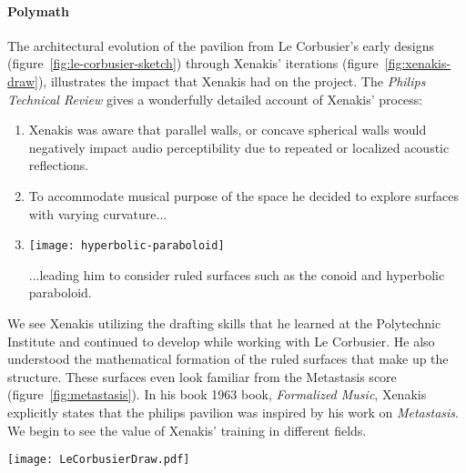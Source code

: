 \paragraph{Polymath} The architectural evolution of the pavilion from
Le Corbusier's early designs (figure~\ref{fig:le-corbusier-sketch})
through Xenakis' iterations (figure~\ref{fig:xenakis-draw}),
illustrates the impact that Xenakis had on the project. The
\textit{Philips Technical Review}\cite{philips1958} gives a
wonderfully detailed account of Xenakis' process:
\begin{enumerate}
\item Xenakis was aware that parallel walls, or concave spherical
  walls would negatively impact audio perceptibility due to repeated
  or localized acoustic reflections.
\item To accommodate musical purpose of the space he decided to explore
  surfaces with varying curvature...
\item 
  \begin{marginfigure}
    \texttt{[image: hyperbolic-paraboloid]}
    \caption{A ruled surface. For a surface to be considered ``ruled'' every point on
      the surface must be on a straight line, and that line must lie
      on the surface. In Xenakis' time ruled surfaces were useful in
      architecture, because they simplified the construction of curved
      surfaces by using straight beams.}
    \label{fig:ruled-surface}
  \end{marginfigure}...leading him to consider ruled surfaces such as
  the conoid and hyperbolic paraboloid. 
\end{enumerate}
We see Xenakis utilizing the drafting skills that he learned at the
Polytechnic Institute and continued to develop while working with Le
Corbusier. He also understood the mathematical formation of the ruled
surfaces that make up the structure. These surfaces even look familiar
from the Metastasis score (figure~\ref{fig:metastasis}). In his book
1963 book, \textit{Formalized Music}, Xenakis explicitly states that
the philips pavilion was inspired by his work on
\textit{Metastasis}. We begin to see the value of Xenakis' training in
different fields.

\begin{figure*}[h]
  \texttt{[image: LeCorbusierDraw.pdf]}
  \caption{Le Corbusier's design sketches for the Philips Pavilion,
    September \textendash{} October, 1956 (\textcircled{c} 2012
    Artists Rights Society, New York/ADAGP, Paris/FLC)}
  \label{fig:le-corbusier-sketch}
\end{figure*}


